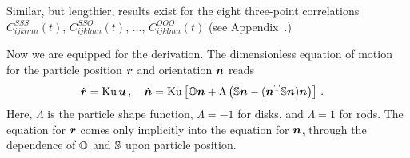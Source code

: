 \documentclass[thesis.tex]{subfiles}
\begin{document}
Similar, but lengthier, results exist for the eight three-point correlations $C^{SSS}_{ijklmn}(t)$, $C^{SSO}_{ijklmn}(t)$, ..., $C^{OOO}_{ijklmn}(t)$ (see Appendix~.)

Now we are equipped for the derivation. The dimensionless equation of motion for the particle position $\mbox{\boldmath$r$}$ and orientation $\mbox{\boldmath$n$}$ reads
\begin{align}
\dot{\ve r}&=\ku\,\ve u\,,\quad
\dot{\ve n}=\ku\left[\ma O\ve n+\Lambda\left(\ma S\ve n-(\ve n\transpose\ma S\ve n)\ve n\right)\right]\,.\eqnlab{turbeqnofmotion}
\end{align}
Here, $\Lambda$ is the particle shape function, $\Lambda=-1$ for disks, and $\Lambda=1$ for rods. The equation for $\mbox{\boldmath$r$}$ comes only implicitly into the equation for $\mbox{\boldmath$n$}$, through the dependence of $\mathbb{O}$ and $\mathbb{S}$ upon particle position.
\end{document}
